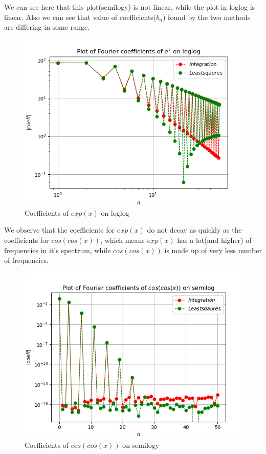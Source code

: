 \documentclass[11pt, a4paper]{article}
\begin{document}
    We can see here that this plot(semilogy) is not linear, while the plot in loglog is linear. Also we can see that value of coefficients($b_n$) found by the two methods are differing in some range.
    \begin{figure}[!h]
        \centering
        \includegraphics[scale = 0.8]{Figure 4.png}
        \caption{Coefficients of $exp(x)$ on loglog}
        \label{fig:Figure 4}
    \end{figure}
    
    We observe that the coefficients for $exp(x)$ do not decay as quickly as the coefficients for $cos(cos(x))$, which means $exp(x)$ has a lot(and higher) of frequencies in it's spectrum, while $cos(cos(x))$ is made up of very less number of frequencies.
    \begin{figure}[!h]
        \centering
        \includegraphics[scale = 0.8]{Figure 5.png}
        \caption{Coefficients of $cos(cos(x))$ on semilogy}
        \label{fig:Figure 5}
    \end{figure}
    
\end{document}
